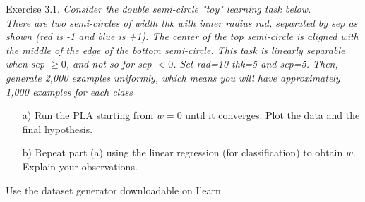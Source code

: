 \documentclass[12pt]{article}
\newenvironment{exercise}[1][]{%
  \bigskip                          %
  \noindent \textsf{Exercise #1.}\slshape }{}
\begin{document}


\begin{exercise}[3.1] %
Consider the double semi-circle "toy" learning task below. \\
There are two semi-circles of width \textit{thk} with inner radius
\textit{rad}, separated by \textit{sep} as shown (red is -1 and blue is +1).
The center of the top semi-circle is aligned with the middle of the 
edge of the bottom semi-circle. This task is linearly separable when 
\textit{sep} $\geq0$, and not so for \textit{sep} $<0$. Set \textit{rad}=10
\textit{thk}=5 and \textit{sep}=5. Then, generate 2,000 examples 
uniformly, which means you will have approximately 1,000 examples for each class 
\begin{enumerate}
  \item[a)] Run the PLA starting from $w=0$ until it converges. Plot the
  data and the final hypothesis.  
  \item[b)] Repeat part (a) using the linear regression (for classification) 
  to obtain $w$. Explain your observations.  
\end{enumerate}
Use the dataset generator downloadable on Ilearn. 
\end{exercise}
   
\end{document}
